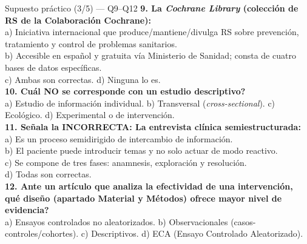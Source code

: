 \documentclass[aspectratio=169,8pt]{beamer}
\begin{document}
\begin{frame}{Supuesto pr\'actico (3/5) --- Q9--Q12}
  \scriptsize
  \textbf{9. La \emph{Cochrane Library} (colecci\'on de RS de la Colaboraci\'on Cochrane):}\\
  a) Iniciativa internacional que produce/mantiene/divulga RS sobre prevenci\'on, tratamiento y control de problemas sanitarios.\\
  b) Accesible en espa\~nol y gratuita v\'ia Ministerio de Sanidad; consta de cuatro bases de datos espec\'ificas.\\
  c) Ambas son correctas. \; d) Ninguna lo es.\\[4pt]
  \textbf{10. \textquestiondown{}Cu\'al NO se corresponde con un estudio descriptivo?}\\
  a) Estudio de informaci\'on individual. \; b) Transversal (\emph{cross-sectional}). \; c) Ecol\'ogico. \; d) Experimental o de intervenci\'on.\\[4pt]
  \textbf{11. Se\~nala la INCORRECTA: La entrevista cl\'inica semiestructurada:}\\
  a) Es un proceso semidirigido de intercambio de informaci\'on.\\
  b) El paciente puede introducir temas y no solo actuar de modo reactivo.\\
  c) Se compone de tres fases: anamnesis, exploraci\'on y resoluci\'on.\\
  d) Todas son correctas.\\[4pt]
  \textbf{12. Ante un art\'iculo que analiza la efectividad de una intervenci\'on, \textquestiondown{}qu\'e dise\~no (apartado Material y M\'etodos) ofrece mayor nivel de evidencia?}\\
  a) Ensayos controlados no aleatorizados. \; b) Observacionales (casos-controles/cohortes). \; c) Descriptivos. \; d) ECA (Ensayo Controlado Aleatorizado).
\end{frame}
\end{document}
